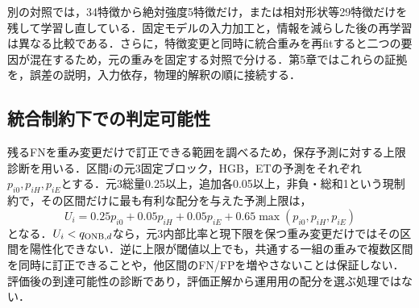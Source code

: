 別の対照では，34特徴から絶対強度5特徴だけ，または相対形状等29特徴だけを残して学習し直している．固定モデルの入力加工と，情報を減らした後の再学習は異なる比較である．さらに，特徴変更と同時に統合重みを再fitすると二つの要因が混在するため，元の重みを固定する対照で分ける．第5章ではこれらの証拠を，誤差の説明，入力依存，物理的解釈の順に接続する．

\subsection{統合制約下での判定可能性}
残るFNを重み変更だけで訂正できる範囲を調べるため，保存予測に対する上限診断\cite{localFeasibility}を用いる．区間$i$の元3固定ブロック，HGB，ETの予測をそれぞれ$p_{i0},p_{iH},p_{iE}$とする．元3総量0.25以上，追加各0.05以上，非負・総和1という現制約で，その区間だけに最も有利な配分を与えた予測上限は，
\begin{equation}\label{eq:ceiling}
 U_i=0.25p_{i0}+0.05p_{iH}+0.05p_{iE}
       +0.65\max(p_{i0},p_{iH},p_{iE})
\end{equation}
となる．$U_i<q_{\mathrm{ONB},d}$なら，元3内部比率と現下限を保つ重み変更だけではその区間を陽性化できない．逆に上限が閾値以上でも，共通する一組の重みで複数区間を同時に訂正できることや，他区間のFN/FPを増やさないことは保証しない．評価後の到達可能性の診断であり，評価正解から運用用の配分を選ぶ処理ではない．
